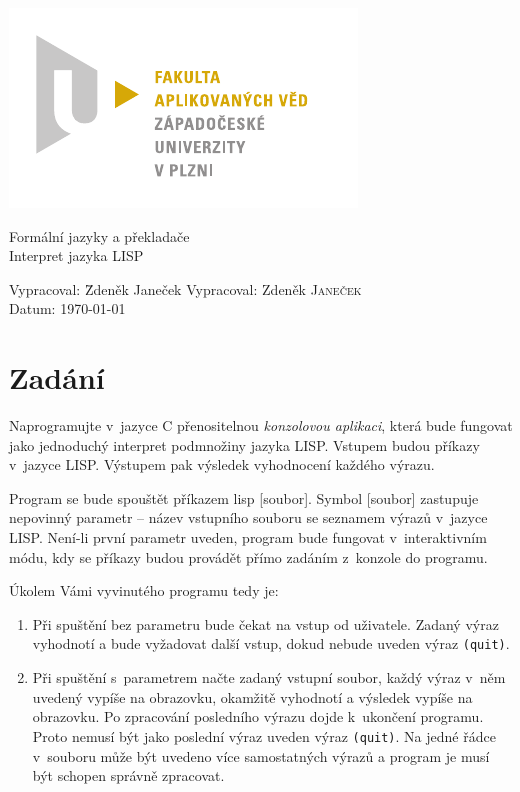 \documentclass[a4paper, 12pt]{article}
\begin{document}
\begin{titlepage}
\includegraphics{fav_cmyk.pdf}
\vfill
\begin{center}
{\huge Formální jazyky a překladače}\\[3ex]
{\Large Interpret jazyka LISP}
\end{center}
\vfill
\begin{tabbing}
Vypracoval: \hspace{1ex}\=Zdeněk Janeček\kill
Vypracoval: \>Zdeněk \textsc{Janeček}\\[1ex]
Datum:\> \today
\end{tabbing}
\end{titlepage}

\tableofcontents

\section{Zadání}
Naprogramujte v~jazyce C přenositelnou \emph{konzolovou aplikaci}, která
bude fungovat jako jednoduchý interpret podmnožiny jazyka LISP.
Vstupem budou příkazy v~jazyce LISP. Výstupem pak výsledek vyhodnocení
každého výrazu.

Program se bude spouštět příkazem \textsf{lisp [soubor]}. Symbol
\textsf{[soubor]} zastupuje nepovinný parametr -- název vstupního
souboru se seznamem výrazů v~jazyce LISP. Není-li první parametr
uveden, program bude fungovat v~interaktivním módu, kdy se příkazy
budou provádět přímo zadáním z~konzole do programu.

Úkolem Vámi vyvinutého programu tedy je:
\begin{enumerate}
\item Při spuštění bez parametru bude čekat na vstup od uživatele.
  Zadaný výraz vyhodnotí a bude vyžadovat další vstup, dokud nebude
  uveden výraz \texttt{(quit)}.
\item Při spuštění s~parametrem načte zadaný vstupní soubor, každý
  výraz v~něm uvedený vypíše na obrazovku, okamžitě vyhodnotí a
  výsledek vypíše na obrazovku. Po zpracování posledního výrazu dojde
  k~ukončení programu. Proto nemusí být jako poslední výraz uveden
  výraz \texttt{(quit)}. Na jedné řádce v~souboru může být uvedeno
  více samostatných výrazů a program je musí být schopen správně
  zpracovat.
\end{enumerate}
\end{document}
